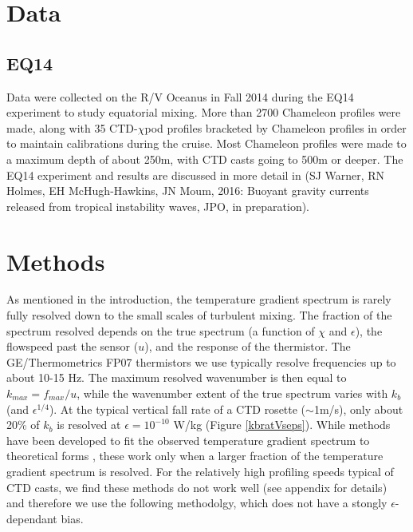 \documentclass{ametsoc}
\begin{document}
\section{Data }


\subsection{EQ14}

Data were collected on the R/V Oceanus in Fall 2014 during the EQ14 experiment to study equatorial mixing.  More than 2700 Chameleon profiles were made, along with 35 CTD-$\chi$pod profiles bracketed by Chameleon profiles in order to maintain calibrations during the cruise. Most Chameleon profiles were made to a maximum depth of about 250m, with CTD casts going to 500m or deeper. The EQ14 experiment and results are discussed in more detail in (SJ Warner, RN Holmes, EH McHugh-Hawkins, JN Moum, 2016: Buoyant gravity currents released from tropical instability waves, JPO, in preparation).




\section{Methods}


As mentioned in the introduction, the temperature gradient spectrum is rarely fully resolved down to the small scales of turbulent mixing. The fraction of the spectrum resolved depends on the true spectrum (a function of $\chi$ and $\epsilon$), the flowspeed past the sensor ($u$), and the response of the thermistor. The GE/Thermometrics FP07 thermistors we use typically resolve frequencies up to about 10-15 Hz. The maximum resolved wavenumber is then equal to $k_{max}=f_{max}/u$, while the wavenumber extent of the true spectrum varies with $k_b$ (and $\epsilon^{1/4}$). At the typical vertical fall rate of a CTD rosette ($\sim$1m/s), only about 20\% of $k_b$ is resolved at $\epsilon=10^{-10}$ W/kg (Figure \ref{kbratVseps}). While methods have been developed to fit the observed temperature gradient spectrum to theoretical forms \citep{ruddicketal00}, these work only when a larger fraction of the temperature gradient spectrum is resolved. For the relatively high profiling speeds typical of CTD casts, we find these methods do not work well (see appendix for details) and therefore we use the following methodolgy, which does not have a stongly $\epsilon$-dependant bias.
\end{document}
